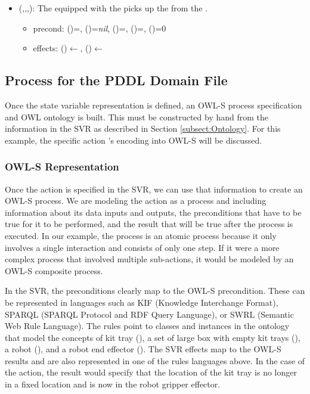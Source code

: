 \begin{itemize}
\item {}(,,,): The   equipped with the   picks up the   from the  .
\begin{itemize}
\item precond: ()=, ()=\textit{nil}, ()=, ()=, ()=0
\item effects: ()$\leftarrow$, ()$\leftarrow$
\end{itemize}
\end{itemize}




\subsection{Process for the PDDL Domain File}
\label{subsect:PDDL_Domain_File}
Once the state variable representation is defined, an OWL-S process specification and OWL ontology is built. This must be constructed by hand from the information in the SVR as described in Section \ref{subsect:Ontology}. For this example, the specific action  's encoding into OWL-S will be discussed. 

\subsubsection{OWL-S Representation}
Once the action is specified in the SVR, we can use that information to create an OWL-S process. We are modeling the action as a process and including information about its data inputs and outputs, the preconditions that have to be true for it to be performed, and the result that will be true after the process is executed. In our example, the process is an atomic process because it only involves a single interaction and consists of only one step. If it were a more complex process that involved multiple sub-actions, it would be modeled by an OWL-S composite process.

In the SVR, the preconditions clearly map to the OWL-S precondition. These can be represented in languages such as KIF \cite{KIF} (Knowledge Interchange Format), SPARQL \cite{SPARQL} (SPARQL Protocol and RDF Query Language), or SWRL \cite{SWRL-W3C} (Semantic Web Rule Language). The rules point to classes and instances in the ontology that model the concepts of kit tray (), a set of large box with empty kit trays (), a robot (), and a robot end effector (). The SVR effects map to the OWL-S results and are also represented in one of the rules languages above. In the case of the  action, the result would specify that the location of the kit tray is no longer in a fixed location and is now in the robot gripper effector.

